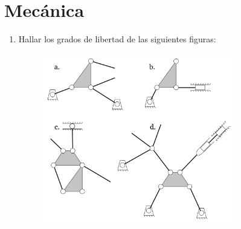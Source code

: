 \section{Mecánica}

\begin{enumerate}
\item Hallar los grados de libertad de las siguientes figuras:
\begin{figure}[H]
    \centering
    \includegraphics[width=0.8\textwidth]{Images/gradosDeLibertad.png}
\end{figure}

\end{enumerate}
